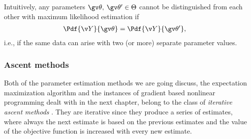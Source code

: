 Intuitively, any parameters $\Th,\:\Th' \in \Theta$ cannot be distinguished
from each other with maximum likelihood estimation if
\begin{align}
	\Pdf{\Y}{\Th}&=\Pdf{\Y}{\Th'},
\end{align}
i.e., if the same data can arise with two (or more) separate
parameter values.
\parencite{Haykin2001,Cappe2005}

\subsubsection{Ascent methods}

Both of the parameter estimation methods we are going
discuss, the expectation maximization algorithm and
the instances of gradient based nonlinear programming dealt with in the
next chapter, belong to the class of \emph{iterative ascent methods} \parencite{luenberger2008}.
They are iterative since they produce a series of estimates, where
always the next estimate is based on the previous estimates and
the value of the objective function is increased with every new estimate.

